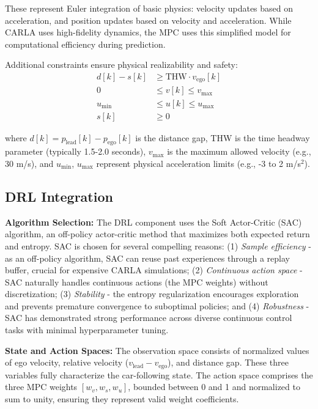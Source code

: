 \documentclass[conference,onecolumn,draftclsnofoot]{IEEEtran}
\begin{document}
These represent Euler integration of basic physics: velocity updates based on acceleration, and position updates based on velocity and acceleration. While CARLA uses high-fidelity dynamics, the MPC uses this simplified model for computational efficiency during prediction.

Additional constraints ensure physical realizability and safety:
\begin{align}
d[k] - s[k] &\geq \text{THW} \cdot v_{\text{ego}}[k] \\
0 &\leq v[k] \leq v_{\max} \\
u_{\min} &\leq u[k] \leq u_{\max} \\
s[k] &\geq 0
\end{align}

where $d[k] = p_{\text{lead}}[k] - p_{\text{ego}}[k]$ is the distance gap, THW is the time headway parameter (typically 1.5-2.0 seconds), $v_{\max}$ is the maximum allowed velocity (e.g., 30 m/s), and $u_{\min}$, $u_{\max}$ represent physical acceleration limits (e.g., -3 to 2 m/s$^2$).

\subsection{DRL Integration}

\textbf{Algorithm Selection:} The DRL component uses the Soft Actor-Critic (SAC) algorithm, an off-policy actor-critic method that maximizes both expected return and entropy. SAC is chosen for several compelling reasons: (1) \textit{Sample efficiency} - as an off-policy algorithm, SAC can reuse past experiences through a replay buffer, crucial for expensive CARLA simulations; (2) \textit{Continuous action space} - SAC naturally handles continuous actions (the MPC weights) without discretization; (3) \textit{Stability} - the entropy regularization encourages exploration and prevents premature convergence to suboptimal policies; and (4) \textit{Robustness} - SAC has demonstrated strong performance across diverse continuous control tasks with minimal hyperparameter tuning.

\textbf{State and Action Spaces:} The observation space consists of normalized values of ego velocity, relative velocity ($v_{\text{lead}} - v_{\text{ego}}$), and distance gap. These three variables fully characterize the car-following state. The action space comprises the three MPC weights $[w_v, w_s, w_u]$, bounded between 0 and 1 and normalized to sum to unity, ensuring they represent valid weight coefficients.
\end{document}
